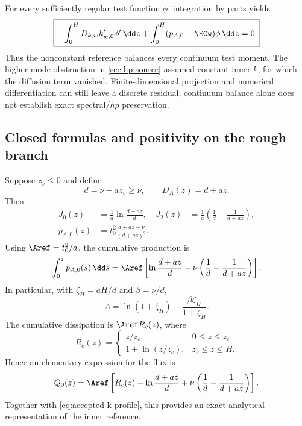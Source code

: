 For every sufficiently regular test function $\phi$, integration
by parts yields
\begin{equation}
 \boxed{-\int_0^H D_{k,w}k_{w,0}'\phi'\,\dd z
 +\int_0^H(p_{A,0}-\ECw)\phi\,\dd z=0.}
 \label{eq:accepted-weak-equilibrium}
\end{equation}
Thus the nonconstant reference balances every continuum test
moment. The higher-mode obstruction in \cref{sec:hp-source}
assumed constant inner $k$, for which the diffusion term vanished.
Finite-dimensional projection and numerical differentiation can
still leave a discrete residual; continuum balance alone does not
establish exact spectral/$hp$ preservation.

\subsection{Closed formulas and positivity on the rough branch}
\label{app:accepted-awf-rough}

Suppose $z_v\leq0$ and define
\begin{equation}
 d=\nu-az_v\geq\nu,\qquad D_A(z)=d+az.
 \label{eq:accepted-rough-D}
\end{equation}
Then
\begin{equation}
 \begin{aligned}
 J_0(z)&=\frac1a\ln\frac{d+az}{d},&
 J_2(z)&=\frac1a\left(\frac1d-\frac1{d+az}\right),\\
 p_{A,0}(z)&=t_0^2\frac{d+az-\nu}{(d+az)^2}.&&
 \end{aligned}
 \label{eq:accepted-rough-integrals}
\end{equation}
Using $\Aref=t_0^2/a$, the cumulative production is
\begin{equation}
 \int_0^z p_{A,0}(s)\,\dd s
 =\Aref\left[
 \ln\frac{d+az}{d}
 -\nu\left(\frac1d-\frac1{d+az}\right)\right].
 \label{eq:accepted-rough-production-integral}
\end{equation}
In particular, with $\zeta_H=aH/d$ and $\beta=\nu/d$,
\begin{equation}
 \Lambda=\ln(1+\zeta_H)
          -\frac{\beta\zeta_H}{1+\zeta_H}.
 \label{eq:accepted-rough-Lambda}
\end{equation}
The cumulative dissipation is $\Aref R_c(z)$, where
\begin{equation}
 R_c(z)=\begin{cases}
 z/z_c,&0\leq z\leq z_c,\\
 1+\ln(z/z_c),&z_c\leq z\leq H.
 \end{cases}
 \label{eq:accepted-Rc}
\end{equation}
Hence an elementary expression for the flux is
\begin{equation}
 Q_0(z)=\Aref\left[
 R_c(z)-\ln\frac{d+az}{d}
 +\nu\left(\frac1d-\frac1{d+az}\right)\right].
 \label{eq:accepted-rough-Q}
\end{equation}
Together with \cref{eq:accepted-k-profile}, this provides an exact
analytical representation of the inner reference.

